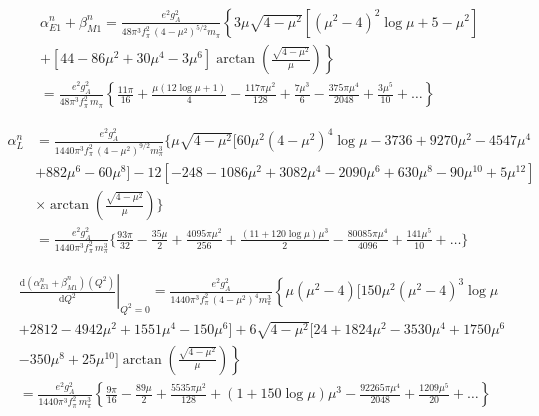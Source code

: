 \documentclass[11pt,preprint,tightenlines,
showpacs,preprintnumbers,amsmath,amssymb,superscriptaddress,a4paper,nofootinbib]{revtex4-1}
\def\dd{\mathrm{d}}
\begin{document}


\begin{align}
&\alpha_{E1}^n+\beta_{M1}^n = \frac{e^2 g_A^2}{48\pi^3 f_\pi^2\,  (4-\mu^2)^{5/2} m_\pi} \left\{ 3 \mu \sqrt{4-\mu^2} \left[  (\mu^2-4)^2 \log\mu+5-\mu^2 \right]\right. \nonumber \\
& \left. + \left[44-86\mu^2+30\mu^4 -3 \mu^6 \right] \arctan\left( \frac{\sqrt{4-\mu^2}}{\mu} \right)\right\} \nonumber \\
& = \frac{e^2 g_A^2}{48\pi^3 f_\pi^2\, m_\pi} \left\{  \frac{11 \pi}{16} + \frac{\mu (12 \log \mu +1)}{4} - \frac{117 \pi \mu^2}{128} +\frac{ 7 \mu^3 }{6 } - \frac{ 375\pi \mu^4 }{2048 }  + \frac{ 3 \mu^5 }{10 }+\dots\right\}
\end{align}


\begin{align}
\alpha_{L}^n &= \frac{e^2 g_A^2}{1440 \pi^3 f_\pi^2\,  (4-\mu^2)^{9/2} m_\pi^3}\Big\{   \mu  \sqrt{4-\mu^2} [ 60 \mu^2 (4-\mu^2)^4  \log\mu -3736 + 9270 \mu^2 - 4547 \mu^4  \nonumber\\
& + 882 \mu^6 -60 \mu^8   ]  - 12 [-248 - 1086  \mu^2 + 3082 \mu^4 - 2090 \mu^6 + 630 \mu^8 - 90 \mu^{10} + 5 \mu^{12}] \nonumber \\
&\times\arctan\left( \frac{\sqrt{4-\mu^2}}{\mu}\right) \Big\}\nonumber \\
&= \frac{e^2 g_A^2}{1440 \pi^3 f_\pi^2\,  m_\pi^3}\Big\{ \frac{93 \pi}{32} - \frac{35 \mu}{2} + \frac{4095 \pi \mu^2}{256} +\frac{ (11+ 120 \log\mu )\mu^3}{2} -\frac{80085 \pi \mu^4}{4096} + \frac{141\mu^5}{10} +\dots  \Big\}
\end{align}



\begin{align}
&\left.\frac{\dd(\alpha_{E1}^n+\beta_{M1}^n) (Q^2)}{\dd Q^2}\right|_{Q^2=0}=\frac{e^2 g_A^2}{1440 \pi^3 f_\pi^2\,  (4-\mu^2)^{4} m_\pi^3}\left\{ \mu(\mu^2-4) [150\mu^2 (\mu^2-4)^3  \log\mu \right. \nonumber \\
& +2812-4942 \mu^2 + 1551 \mu^4-150 \mu^6]  + 6 \sqrt{4-\mu^2}[24+1824 \mu^2 - 3530 \mu^4 + 1750 \mu^6 \nonumber \\
&\left.-350 \mu^8 + 25 \mu^{10}] \arctan\left( \frac{\sqrt{4-\mu^2}}{\mu}\right) \right\} \nonumber \\
&= \frac{e^2 g_A^2}{1440 \pi^3 f_\pi^2\,  m_\pi^3} \left\{  \frac{9 \pi}{16} -\frac{89 \mu}{2} + \frac{5535 \pi \mu^2}{128} + \left( 1+ 150 \log\mu\right)\mu^3 -\frac{92265  \pi \mu^4}{2048}  +  \frac{1209 \mu^5}{20} +\dots  \right\}
\end{align}
\end{document}
